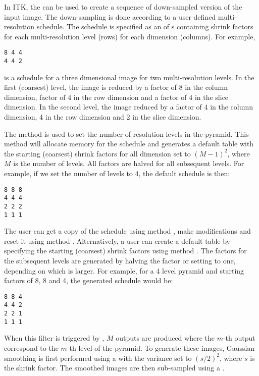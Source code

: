

In ITK, the  can be used to create a
sequence of down-sampled version of the input image.  The down-sampling is done
according to a user defined multi-resolution schedule. The schedule is
specified as an  of s containing shrink factors for
each multi-resolution level (rows) for each dimension (columns). For example,

\begin{verbatim}
8 4 4
4 4 2
\end{verbatim}

is a schedule for a three dimensional image for two multi-resolution levels. 
In the first (coarsest) level, the image is reduced by a factor of 8 
in the column dimension, factor of 4 in the row dimension and a factor
of 4 in the slice dimension. In the second level, the image reduced
by a factor of 4 in the column dimension, 4 in the row dimension and
2 in the slice dimension.


The method  is used to set the number of
resolution levels in the pyramid. This method will allocate memory
for the schedule and generates a default table with the starting
(coarsest) shrink factors for all dimension set to $(M-1)^2$, 
where $M$ is the number of levels. All factors are halved for
all subsequent levels. For example, if we set the number of levels
to 4, the default schedule is then:

\begin{verbatim}
8 8 8
4 4 4
2 2 2
1 1 1
\end{verbatim}


The user can get a copy of the schedule using method ,
make modifications and reset it using method .
Alternatively, a user can create a default table by specifying the
starting (coarsest) shrink factors using method 
. The factors for the subsequent
levels are generated by halving the factor or setting to one, 
depending on which is larger. For example, for a 4 level pyramid
and starting factors of 8, 8 and 4, the generated schedule would be:

\begin{verbatim}
8 8 4
4 4 2
2 2 1
1 1 1
\end{verbatim}

When this filter is triggered by , $M$ outputs are produced
where the $m$-th output correspond to the $m$-th level of the pyramid.
To generate these images, Gaussian smoothing is first performed using a
 with the variance set to $(s/2)^2$,
where $s$ is the shrink factor. The smoothed images are then sub-sampled using
a .
